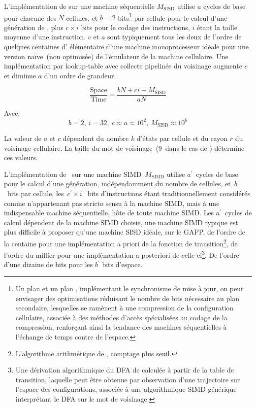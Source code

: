L'impl\'ementation de  sur une machine s\'equentielle
$M_{\text{SISD}}$ utilise $a$ cycles de base pour chacune des $N$
cellules, et $b = 2$ bits\footnote{%
  Un plan  et un plan , impl\'ementant le
  synchronisme de mise \`a jour, on peut envisager des optimisations
  r\'eduisant le nombre de bits n\'ecessaire au plan secondaire,
  lesquelles se ram\`enent \`a une compression de la configuration
  cellulaire, associ\'ee \`a des m\'ethodes d'acc\`es sp\'ecialis\'ees au codage de
  la compression, renfor\c{c}ant ainsi la tendance des machines
  s\'equentielles \`a l'\'echange de temps contre de l'espace.} %
par cellule pour le calcul d'une g\'en\'eration de , plus
$c \times  i$ bits pour le codage des instructions, $i$ \'etant la taille
moyenne d'une instruction. %
$c$ et $a$ sont typiquement tous les deux de l'ordre de quelques
centaines d' \'el\'ementaire d'une machine
monoprocesseur id\'eale pour une version na\"ive~(non optimis\'ee) de
l'\'emulateur de la machine cellulaire. %
Une impl\'ementation par lookup-table avec collecte pipelin\'ee du
voisinage augmente $c$ et diminue $a$ d'un ordre de grandeur. %

\begin{equation}
  \frac{\text{Space}}{\text{Time}} = \frac{bN+ci+M_{\text{SISD}}}{aN}
  \label{eq-life-sisd}
\end{equation}

Avec:\[b = 2,~i = 32,~c \approx a \approx 10^2,~M_{\text{SISD}}
\approx 10^6\]

La valeur de $a$ et $c$ d\'ependent du nombre $k$ d'\'etats par cellule et
du rayon $r$ du voisinage cellulaire. %
La taille du mot de voisinage~(9~dans le cas de )
d\'etermine ces valeurs. %

L'impl\'ementation de~ sur une machine
SIMD~$M_{\text{SIMD}}$ utilise $a^{\prime}$~cycles de base pour le
calcul d'une g\'en\'eration, ind\'ependamment du nombre de cellules,
et~$b^{\prime}$~bits par cellule, les~$c^{\prime} \times  i^{\prime}$~bits
d'instructions \'etant traditionnellement consid\'er\'es comme n'appartenant
pas stricto sensu \`a la machine SIMD, mais \`a une indispensable machine
s\'equentielle, h\^ote de toute machine SIMD\@. %
Les $a^{\prime}$~cycles de calcul d\'ependent de la machine SIMD choisie,
une machine SIMD typique est plus difficile \`a proposer qu'une
machine SISD id\'eale, sur le GAPP, de l'ordre de la centaine pour une
impl\'ementation a priori de la fonction de transition\footnote{%
  L'algorithme arithm\'etique de , comptage plus seuil.}, %
de l'ordre du millier pour une impl\'ementation a posteriori de celle-ci\footnote{%
  Une d\'erivation algorithmique du DFA de  calcul\'ee \`a partir
  de la table de transition, laquelle peut \^etre obtenue par observation
  d'une trajectoire sur l'espace des configurations, associ\'ee \`a une
  algorithmique SIMD g\'en\'erique interpr\'etant le DFA sur le mot de voisinage.}. %
De l'ordre d'une dizaine de bits pour les $b^{\prime}$ bits d'espace. %

